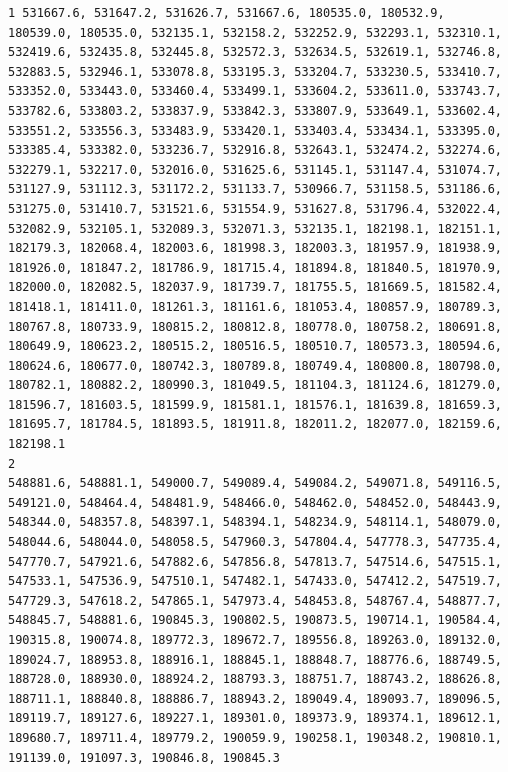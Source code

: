 \documentclass[
  letterpaper,
]{scrbook}
\begin{document}
\begin{verbatim}
1 531667.6, 531647.2, 531626.7, 531667.6, 180535.0, 180532.9, 180539.0, 180535.0, 532135.1, 532158.2, 532252.9, 532293.1, 532310.1, 532419.6, 532435.8, 532445.8, 532572.3, 532634.5, 532619.1, 532746.8, 532883.5, 532946.1, 533078.8, 533195.3, 533204.7, 533230.5, 533410.7, 533352.0, 533443.0, 533460.4, 533499.1, 533604.2, 533611.0, 533743.7, 533782.6, 533803.2, 533837.9, 533842.3, 533807.9, 533649.1, 533602.4, 533551.2, 533556.3, 533483.9, 533420.1, 533403.4, 533434.1, 533395.0, 533385.4, 533382.0, 533236.7, 532916.8, 532643.1, 532474.2, 532274.6, 532279.1, 532217.0, 532016.0, 531625.6, 531145.1, 531147.4, 531074.7, 531127.9, 531112.3, 531172.2, 531133.7, 530966.7, 531158.5, 531186.6, 531275.0, 531410.7, 531521.6, 531554.9, 531627.8, 531796.4, 532022.4, 532082.9, 532105.1, 532089.3, 532071.3, 532135.1, 182198.1, 182151.1, 182179.3, 182068.4, 182003.6, 181998.3, 182003.3, 181957.9, 181938.9, 181926.0, 181847.2, 181786.9, 181715.4, 181894.8, 181840.5, 181970.9, 182000.0, 182082.5, 182037.9, 181739.7, 181755.5, 181669.5, 181582.4, 181418.1, 181411.0, 181261.3, 181161.6, 181053.4, 180857.9, 180789.3, 180767.8, 180733.9, 180815.2, 180812.8, 180778.0, 180758.2, 180691.8, 180649.9, 180623.2, 180515.2, 180516.5, 180510.7, 180573.3, 180594.6, 180624.6, 180677.0, 180742.3, 180789.8, 180749.4, 180800.8, 180798.0, 180782.1, 180882.2, 180990.3, 181049.5, 181104.3, 181124.6, 181279.0, 181596.7, 181603.5, 181599.9, 181581.1, 181576.1, 181639.8, 181659.3, 181695.7, 181784.5, 181893.5, 181911.8, 182011.2, 182077.0, 182159.6, 182198.1
2                                                                                                                                                                                                                                                                                                                                                                                                                                                                                                                                         548881.6, 548881.1, 549000.7, 549089.4, 549084.2, 549071.8, 549116.5, 549121.0, 548464.4, 548481.9, 548466.0, 548462.0, 548452.0, 548443.9, 548344.0, 548357.8, 548397.1, 548394.1, 548234.9, 548114.1, 548079.0, 548044.6, 548044.0, 548058.5, 547960.3, 547804.4, 547778.3, 547735.4, 547770.7, 547921.6, 547882.6, 547856.8, 547813.7, 547514.6, 547515.1, 547533.1, 547536.9, 547510.1, 547482.1, 547433.0, 547412.2, 547519.7, 547729.3, 547618.2, 547865.1, 547973.4, 548453.8, 548767.4, 548877.7, 548845.7, 548881.6, 190845.3, 190802.5, 190873.5, 190714.1, 190584.4, 190315.8, 190074.8, 189772.3, 189672.7, 189556.8, 189263.0, 189132.0, 189024.7, 188953.8, 188916.1, 188845.1, 188848.7, 188776.6, 188749.5, 188728.0, 188930.0, 188924.2, 188793.3, 188751.7, 188743.2, 188626.8, 188711.1, 188840.8, 188886.7, 188943.2, 189049.4, 189093.7, 189096.5, 189119.7, 189127.6, 189227.1, 189301.0, 189373.9, 189374.1, 189612.1, 189680.7, 189711.4, 189779.2, 190059.9, 190258.1, 190348.2, 190810.1, 191139.0, 191097.3, 190846.8, 190845.3

\end{verbatim}
\end{document}
